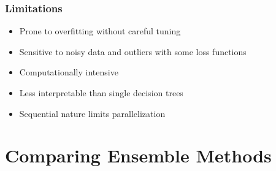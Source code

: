 \documentclass[
  letterpaper,
  DIV=11,
  numbers=noendperiod]{scrreprt}
\providecommand{\tightlist}{%
  \setlength{\itemsep}{0pt}\setlength{\parskip}{0pt}}\usepackage{longtable,booktabs,array}
\begin{document}
\subsubsection{Limitations}\label{limitations-3}

\begin{itemize}
\tightlist
\item
  Prone to overfitting without careful tuning
\item
  Sensitive to noisy data and outliers with some loss functions
\item
  Computationally intensive
\item
  Less interpretable than single decision trees
\item
  Sequential nature limits parallelization
\end{itemize}

\section{Comparing Ensemble Methods}\label{comparing-ensemble-methods}
\end{document}
